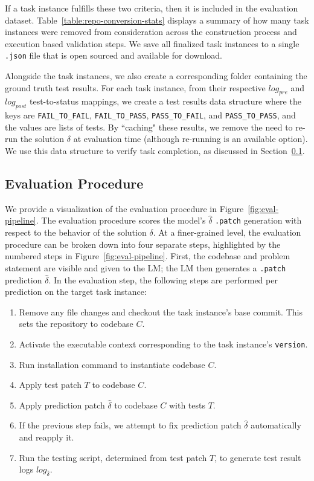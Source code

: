 If a task instance fulfills these two criteria, then it is included in the evaluation dataset.
Table~\ref{table:repo-conversion-stats} displays a summary of how many task instances were removed from consideration across the construction process and execution based validation steps.
We save all finalized task instances to a single \texttt{.json} file that is open sourced and available for download.

Alongside the task instances, we also create a corresponding folder containing the ground truth test results.
For each task instance, from their respective $log_{pre}$ and $log_{post}$ test-to-status mappings, we create a test results data structure where the keys are \texttt{FAIL\_TO\_FAIL}, \texttt{FAIL\_TO\_PASS}, \texttt{PASS\_TO\_FAIL}, and \texttt{PASS\_TO\_PASS}, and the values are lists of tests.
By ``caching" these results, we remove the need to re-run the solution $\delta$ at evaluation time (although re-running is an available option).
We use this data structure to verify task completion, as discussed in Section~\ref{appx:benchmark:eval-procedure}.

\subsection{Evaluation Procedure}
\label{appx:benchmark:eval-procedure}



We provide a visualization of the evaluation procedure in Figure~\ref{fig:eval-pipeline}.
The evaluation procedure scores the model's $\hat{\delta}$ \texttt{.patch} generation with respect to the behavior of the solution $\delta$.
At a finer-grained level, the evaluation procedure can be broken down into four separate steps, highlighted by the numbered steps in Figure~\ref{fig:eval-pipeline}.
First, the codebase and problem statement are visible and given to the LM; the LM then generates a \texttt{.patch} prediction $\hat{\delta}$.
In the evaluation step, the following steps are performed per prediction on the target task instance:

\begin{enumerate}
    \item Remove any file changes and checkout the task instance’s base commit. This sets the repository to codebase $C$.
    \item Activate the executable context corresponding to the task instance's \texttt{version}.
    \item Run installation command to instantiate codebase $C$.
    \item Apply test patch $T$ to codebase $C$.
    \item Apply prediction patch $\hat{\delta}$ to codebase $C$ with tests $T$.
    \item If the previous step fails, we attempt to fix prediction patch $\hat{\delta}$ automatically and reapply it.
    \item Run the testing script, determined from test patch $T$, to generate test result logs $log_{\hat{\delta}}$.
\end{enumerate}

